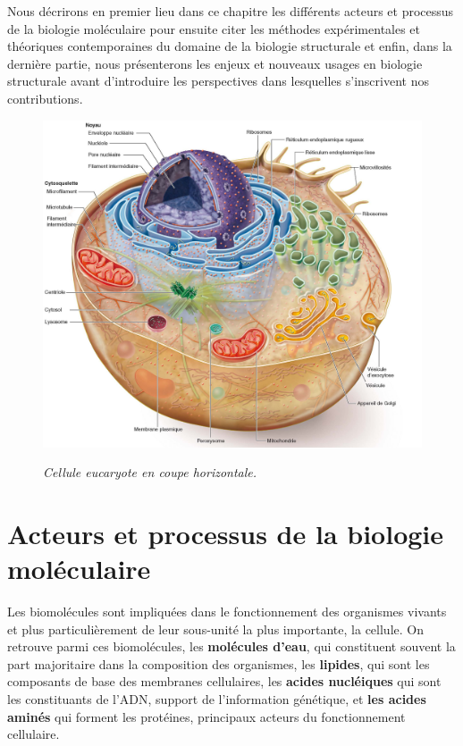 Nous décrirons en premier lieu dans ce chapitre les différents acteurs et processus de la biologie moléculaire pour ensuite citer les méthodes expérimentales et théoriques contemporaines du domaine de la biologie structurale et enfin, dans la dernière partie, nous présenterons les enjeux et nouveaux usages en biologie structurale avant d'introduire les perspectives dans lesquelles s'inscrivent nos contributions. 

\begin{figure}[h]
  \centering
  {\includegraphics[width=1.00\linewidth]{./figures/ch1/cellule}}
    \caption{\it Cellule eucaryote en coupe horizontale.}
    \label{Fig:cellule}
  \hspace{0.2cm}
\end{figure}

\section{Acteurs et processus de la biologie moléculaire}

Les biomolécules sont impliquées dans le fonctionnement des organismes vivants et plus particulièrement de leur sous-unité la plus importante, la cellule. On retrouve parmi ces biomolécules, les \textbf{molécules d'eau}, qui constituent souvent la part majoritaire dans la composition des organismes, les \textbf{lipides}, qui sont les composants de base des membranes cellulaires, les \textbf{acides nucléiques} qui sont les constituants de l'ADN, 
support de l'information génétique, et \textbf{les acides aminés} qui forment les protéines, principaux acteurs du fonctionnement cellulaire.

